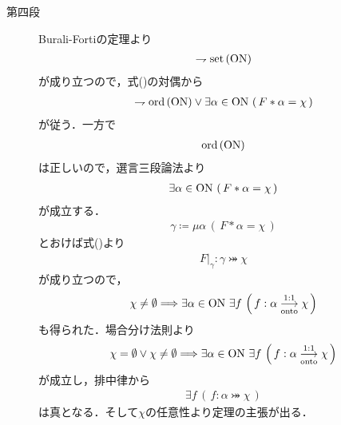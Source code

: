 \begin{prf}
\begin{description}
			\item[第四段]
				Burali-Fortiの定理より
				\begin{align}
					\rightharpoondown \operatorname*{set} \left(\mathrm{ON}\right)
				\end{align}
				が成り立つので，式()の対偶から
				\begin{align}
					\rightharpoondown \operatorname*{ord} \left(\mathrm{ON}\right) \vee 
					\exists \alpha \in \mathrm{ON}\, \left(\, F \ast \alpha = \chi\, \right)
				\end{align}
				が従う．一方で
				\begin{align}
					\operatorname*{ord} \left(\mathrm{ON}\right)
				\end{align}
				は正しいので，選言三段論法より
				\begin{align}
					\exists \alpha \in \mathrm{ON}\, \left(\, F \ast \alpha = \chi\, \right)
				\end{align}
				が成立する．
				\begin{align}
					\gamma \coloneqq \mu \alpha \, \left(\, F \ast \alpha = \chi\, \right)
				\end{align}
				とおけば式()より
				\begin{align}
					F|_\gamma:\gamma \bij \chi
				\end{align}
				が成り立つので，
				\begin{align}
					\chi \neq \emptyset \Longrightarrow \exists \alpha \in \ON\ 
					\exists f\, \left(\, f:\alpha \bij \chi\, \right)
				\end{align}
				も得られた．場合分け法則より
				\begin{align}
					\chi = \emptyset \vee \chi \neq \emptyset \Longrightarrow \exists \alpha \in \ON\ 
					\exists f\, \left(\, f:\alpha \bij \chi\, \right)
				\end{align}
				が成立し，排中律から
				\begin{align}
					\exists f\, \left(\, f:\alpha \bij \chi\, \right)
				\end{align}
				は真となる．そして$\chi$の任意性より定理の主張が出る．
				\QED
		\end{description}
	\end{prf}
	
